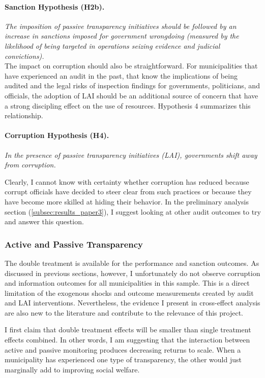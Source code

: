 \documentclass[11pt]{article}
\begin{document}
\paragraph{Sanction Hypothesis (H2b).} \emph{The imposition of passive transparency initiatives should be followed by an increase in sanctions imposed for government wrongdoing (measured by the likelihood of being targeted in operations seizing evidence and judicial convictions).} \\

The impact on corruption should also be straightforward. For municipalities that have experienced an audit in the past, that know the implications of being audited and the legal risks of inspection findings for governments, politicians, and officials, the adoption of LAI should be an additional source of concern that have a strong discipling effect on the use of resources. Hypothesis 4 summarizes this relationship.

\paragraph{Corruption Hypothesis (H4).} \emph{In the presence of passive transparency initiatives (LAI), governments shift away from corruption.}

Clearly, I cannot know with certainty whether corruption has reduced because corrupt officials have decided to steer clear from such practices or because they have become more skilled at hiding their behavior. In the preliminary analysis section (\ref{subsec:results_paper3}), I suggest looking at other audit outcomes to try and answer this question.

\subsubsection{Active and Passive Transparency} \label{subsubsec:theory3_paper3}

The double treatment is available for the performance and sanction outcomes. As discussed in previous sections, however, I unfortunately do not observe corruption and information outcomes for all municipalities in this sample. This is a direct limitation of the exogenous shocks and outcome measurements created by audit and LAI interventions. Nevertheless, the evidence I present in cross-effect analysis are also new to the literature and contribute to the relevance of this project.

I first claim that double treatment effects will be smaller than single treatment effects combined. In other words, I am suggesting that the interaction between active and passive monitoring produces decreasing returns to scale. When a municipality has experienced one type of transparency, the other would just marginally add to improving social welfare.
\end{document}

